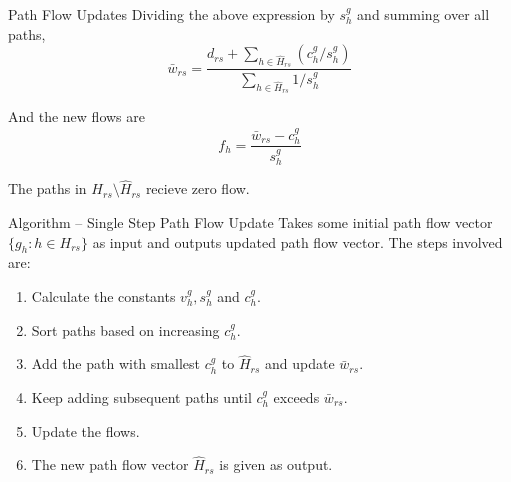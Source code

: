 \documentclass{beamer}
\begin{document}
\begin{frame}{Path Flow Updates}
Dividing the above expression by $s_h^g$ and summing over
all paths,
\[
    \bar{w}_{rs} = \frac{d_{rs} + \sum_{h\in \hat{H}_{rs}}
    ({c_h^g}/{s_h^g})}{\sum_{h\in\hat{H}_{rs}}{1}/{s_h^g}}
\]

And the new flows are
\[
    f_h = \frac{\bar{w}_{rs}-c_h^g}{s^g_h}
\]

The paths in $H_{rs}\setminus \hat{H}_{rs}$ recieve
zero flow.
\end{frame}


\begin{frame}{Algorithm -- Single Step Path Flow Update}
Takes some initial path flow vector $\{g_h: h\in H_{rs}\}$
as input and outputs updated path flow vector.
The steps involved are:
\begin{enumerate}
    \item Calculate the constants $v_h^g, s_h^g$ and
    $c_h^g$.

    \item Sort paths based on increasing $c_h^g$.

    \item Add the path with smallest $c_h^g$ to $\hat{H}_{rs}$
    and update $\bar{w}_{rs}$.

    \item Keep adding subsequent paths until $c_h^g$ exceeds
    $\bar{w}_{rs}$.

    \item Update the flows.

    \item The new path flow vector $\hat{H}_{rs}$ is given as
    output.
\end{enumerate}
\end{frame}


\begin{frame}
\end{frame}
\end{document}
